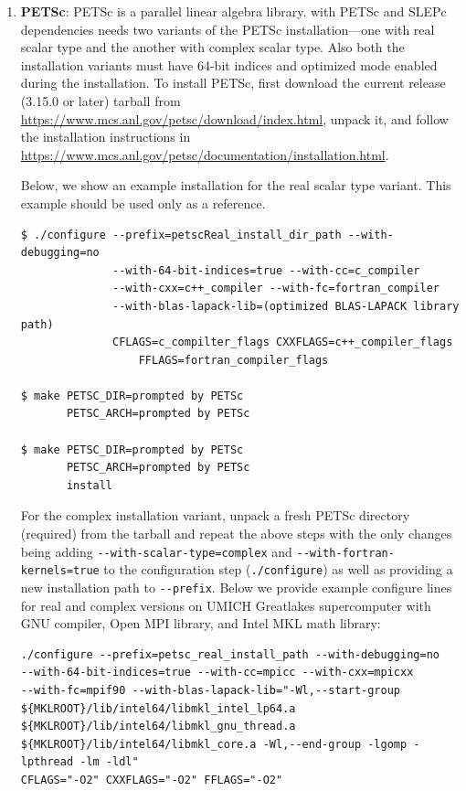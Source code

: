 \begin{enumerate}
\item {\bf PETSc}: PETSc is a parallel linear algebra library. \dftfe{} with PETSc and SLEPc dependencies needs two variants of the PETSc installation---one with real scalar type and the another with complex scalar type. Also both the installation variants must have 64-bit indices and optimized mode enabled during the installation. To install PETSc, first download the current release (3.15.0 or later) tarball from \url{https://www.mcs.anl.gov/petsc/download/index.html}, unpack it, and follow the installation instructions in \url{https://www.mcs.anl.gov/petsc/documentation/installation.html}. 
	
Below, we show an example installation for the real scalar type variant. 
This example should be used only as a reference.
\begin{verbatim}
$ ./configure --prefix=petscReal_install_dir_path --with-debugging=no 
              --with-64-bit-indices=true --with-cc=c_compiler
              --with-cxx=c++_compiler --with-fc=fortran_compiler
              --with-blas-lapack-lib=(optimized BLAS-LAPACK library path) 
              CFLAGS=c_compilter_flags CXXFLAGS=c++_compiler_flags
	              FFLAGS=fortran_compiler_flags

$ make PETSC_DIR=prompted by PETSc 
       PETSC_ARCH=prompted by PETSc

$ make PETSC_DIR=prompted by PETSc 
       PETSC_ARCH=prompted by PETSc
       install
\end{verbatim}
For the complex installation variant, unpack a fresh PETSc directory (required) from the tarball and repeat the above steps with the only changes being adding  \verb|--with-scalar-type=complex| and \verb|--with-fortran-kernels=true| to the configuration step (\verb|./configure|) as well as providing a new installation path to \verb|--prefix|. Below we provide example configure lines for real and complex versions on UMICH Greatlakes supercomputer with GNU compiler, Open MPI library, and Intel MKL math library:
\begin{verbatim}
./configure --prefix=petsc_real_install_path --with-debugging=no 
--with-64-bit-indices=true --with-cc=mpicc --with-cxx=mpicxx 
--with-fc=mpif90 --with-blas-lapack-lib="-Wl,--start-group
${MKLROOT}/lib/intel64/libmkl_intel_lp64.a 
${MKLROOT}/lib/intel64/libmkl_gnu_thread.a 
${MKLROOT}/lib/intel64/libmkl_core.a -Wl,--end-group -lgomp -lpthread -lm -ldl"
CFLAGS="-O2" CXXFLAGS="-O2" FFLAGS="-O2"


\end{verbatim}
\end{enumerate}

